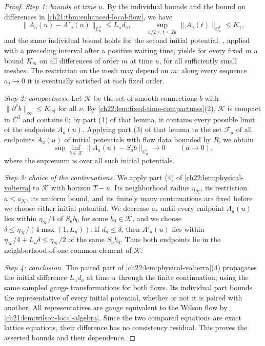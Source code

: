\begin{proof}
\emph{Step 1: bounds at time $u$.} By the individual bounds and the bound on differences in \cref{ch21:thm:enhanced-local-flow}, we have
\[
 \|A_a(u)-A'_a(u)\|_{C_a^1}\le L_ud_a,\qquad \sup_{u/2\le t\le2u}\|A_a(t)\|_{C_a^1}\le K_1,
\]
and the same individual bound holds for the second initial potential. , applied with a preceding interval after a positive waiting time, yields for every fixed $m$ a bound $K_m$ on all differences of order $m$ at time $u$, for all sufficiently small meshes. The restriction on the mesh may depend on $m$; along every sequence $a_j\to0$ it is eventually satisfied at each fixed order.

\emph{Step 2: compactness.} Let $\mathscr K$ be the set of smooth connections $b$ with $\|\partial^\nu b\|_\infty\le K_{|\nu|}$ for all $\nu$. By \cref{ch22:lem:fixed-time-compactness}(2), $\mathscr K$ is compact in $C^3$ and contains $0$; by part (1) of that lemma, it contains every possible limit of the endpoints $A_a(u)$. Applying part (3) of that lemma to the set $\mathcal F_a$ of all endpoints $A_a(u)$ of initial potentials with flow data bounded by $R$, we obtain
\[
 \sup\inf_{b\in\mathscr K}\|A_a(u)-S_ab\|_{C_a^1}\longrightarrow0\qquad(a\to0),
\]
where the supremum is over all such initial potentials.

\emph{Step 3: choice of the continuations.} We apply part (4) of \cref{ch22:lem:physical-volterra} to $\mathscr K$ with horizon $T-u$. Its neighborhood radius $\eta_{\mathscr K}$, its restriction $a\le a_{\mathscr K}$, its uniform bound, and its finitely many continuations are fixed before we choose either initial potential. We decrease $a_*$ until every endpoint $A_a(u)$ lies within $\eta_{\mathscr K}/4$ of $S_ab_0$ for some $b_0\in\mathscr K$, and we choose $\delta\le\eta_{\mathscr K}/(4\max(1,L_u))$. If $d_a\le\delta$, then $A'_a(u)$ lies within $\eta_{\mathscr K}/4+L_u\delta\le\eta_{\mathscr K}/2$ of the same $S_ab_0$. Thus both endpoints lie in the neighborhood of one common element of $\mathscr K$.

\emph{Step 4: conclusion.} The paired part of \cref{ch22:lem:physical-volterra}(4) propagates the initial difference $L_ud_a$ at time $u$ through the finite continuation, using the same sampled gauge transformations for both flows. Its individual part bounds the representative of every initial potential, whether or not it is paired with another. All representatives are gauge equivalent to the Wilson flow by \cref{ch21:lem:wilson-local-algebra}. Since the two compared equations are exact lattice equations, their difference has no consistency residual. This proves the asserted bounds and their dependence.
\end{proof}

